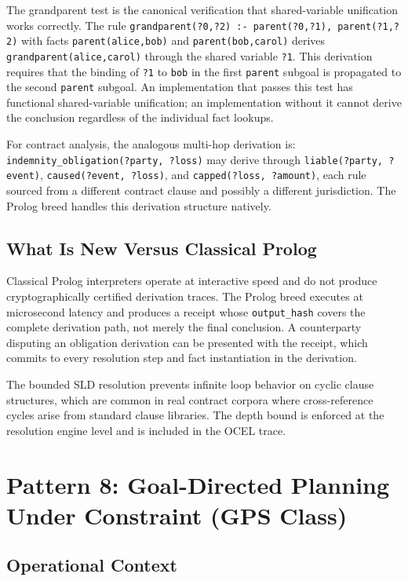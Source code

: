 The grandparent test is the canonical verification that shared-variable unification
works correctly. The rule \texttt{grandparent(?0,?2) :- parent(?0,?1), parent(?1,?2)}
with facts \texttt{parent(alice,bob)} and \texttt{parent(bob,carol)} derives
\texttt{grandparent(alice,carol)} through the shared variable \texttt{?1}. This
derivation requires that the binding of \texttt{?1} to \texttt{bob} in the first
\texttt{parent} subgoal is propagated to the second \texttt{parent} subgoal.
An implementation that passes this test has functional shared-variable unification;
an implementation without it cannot derive the conclusion regardless of the
individual fact lookups.

For contract analysis, the analogous multi-hop derivation is: \texttt{indemnity\_obligation(?party, ?loss)} may derive through
\texttt{liable(?party, ?event)}, \texttt{caused(?event, ?loss)}, and
\texttt{capped(?loss, ?amount)}, each rule sourced from a different contract
clause and possibly a different jurisdiction. The Prolog breed handles this
derivation structure natively.

\subsection*{What Is New Versus Classical Prolog}

Classical Prolog interpreters operate at interactive speed and do not produce
cryptographically certified derivation traces. The Prolog breed executes at
microsecond latency and produces a receipt whose \texttt{output\_hash} covers
the complete derivation path, not merely the final conclusion. A counterparty
disputing an obligation derivation can be presented with the receipt, which
commits to every resolution step and fact instantiation in the derivation.

The bounded SLD resolution prevents infinite loop behavior on cyclic clause
structures, which are common in real contract corpora where cross-reference
cycles arise from standard clause libraries. The depth bound is enforced at
the resolution engine level and is included in the OCEL trace.

\section{Pattern 8: Goal-Directed Planning Under Constraint (GPS Class)}
\label{sec:gps-deployment}

\subsection*{Operational Context}

